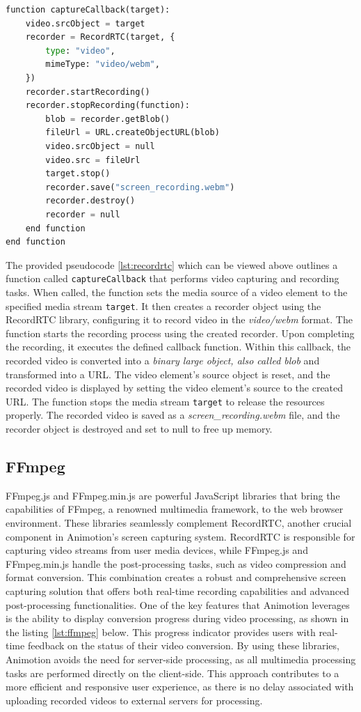 \begin{lstlisting}[language=Python,caption=Starting the screen capture process,label=lst:recordrtc]
  function captureCallback(target):
    video.srcObject = target
    recorder = RecordRTC(target, {
        type: "video",
        mimeType: "video/webm",
    })
    recorder.startRecording()
    recorder.stopRecording(function):
        blob = recorder.getBlob()
        fileUrl = URL.createObjectURL(blob)
        video.srcObject = null
        video.src = fileUrl
        target.stop()
        recorder.save("screen_recording.webm")
        recorder.destroy()
        recorder = null
    end function
end function
\end{lstlisting}

The provided pseudocode \ref{lst:recordrtc} which can be viewed above outlines a function called \texttt{captureCallback}
that performs video capturing and recording tasks. When called, the function sets the media source of a video 
element to the specified media stream \texttt{target}. It then creates a recorder object using the RecordRTC library, 
configuring it to record video in the \emph{video/webm} format.
The function starts the recording process using the created recorder. Upon completing the recording, 
it executes the defined callback function. Within this callback, the recorded video is converted into a 
\emph{binary large object, also called blob} and transformed into a URL. The video element's source object is reset, and 
the recorded video is displayed by setting the video element's source to the created URL.
The function stops the media stream \texttt{target} to release the resources properly. 
The recorded video is saved as a \emph{screen\_recording.webm} file, and the recorder object is destroyed and set to null to free up memory.

\subsection{FFmpeg}
FFmpeg.js and FFmpeg.min.js are powerful JavaScript libraries that bring the capabilities 
of FFmpeg, a renowned multimedia framework, to the web browser environment. These libraries seamlessly complement 
RecordRTC, another crucial component in Animotion's screen capturing system. RecordRTC is responsible for 
capturing video streams from user media devices, while FFmpeg.js and FFmpeg.min.js handle the post-processing tasks, 
such as video compression and format conversion. This combination creates a robust and comprehensive screen capturing 
solution that offers both real-time recording capabilities and advanced post-processing functionalities.
One of the key features that Animotion leverages is the ability to display conversion progress during video processing, 
as shown in the listing \ref{lst:ffmpeg} below. This progress indicator provides users with real-time feedback on the status of their video conversion.
By using these libraries, Animotion avoids the need for server-side processing, as all multimedia 
processing tasks are performed directly on the client-side. This approach contributes to a more efficient and 
responsive user experience, as there is no delay associated with uploading recorded videos to external servers for processing. \cite{ffmpeg}

